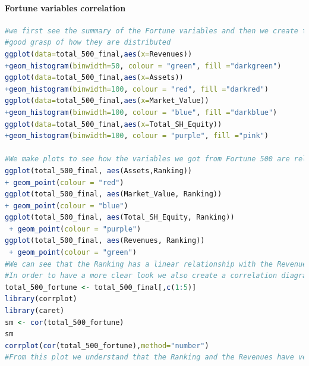 \documentclass{article}
\begin{document}
\paragraph{Fortune variables correlation}\label{r: van: fortune}
\begin{lstlisting}[language=R] 
#we first see the summary of the Fortune variables and then we create their histogram so as to have a 
#good grasp of how they are distributed
ggplot(data=total_500_final,aes(x=Revenues))
+geom_histogram(binwidth=50, colour = "green", fill ="darkgreen")
ggplot(data=total_500_final,aes(x=Assets))
+geom_histogram(binwidth=100, colour = "red", fill ="darkred")
ggplot(data=total_500_final,aes(x=Market_Value))
+geom_histogram(binwidth=100, colour = "blue", fill ="darkblue")
ggplot(data=total_500_final,aes(x=Total_SH_Equity))
+geom_histogram(binwidth=100, colour = "purple", fill ="pink")

#We make plots to see how the variables we got from Fortune 500 are related with the Ranking
ggplot(total_500_final, aes(Assets,Ranking)) 
+ geom_point(colour = "red")
ggplot(total_500_final, aes(Market_Value, Ranking)) 
+ geom_point(colour = "blue")
ggplot(total_500_final, aes(Total_SH_Equity, Ranking))
 + geom_point(colour = "purple")
ggplot(total_500_final, aes(Revenues, Ranking))
 + geom_point(colour = "green")
#We can see that the Ranking has a linear relationship with the Revenues so we will use one of those 2 variables to check the relationships with the websites metrics
#In order to have a more clear look we also create a correlation diagram
total_500_fortune <- total_500_final[,c(1:5)]
library(corrplot)
library(caret)
sm <- cor(total_500_fortune)
sm
corrplot(cor(total_500_fortune),method="number")
#From this plot we understand that the Ranking and the Revenues have very high correlation. 
\end{lstlisting}
\end{document}

